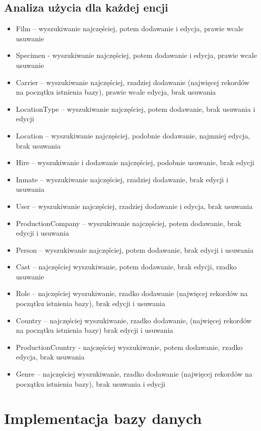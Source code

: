 \documentclass{article}
\begin{document}
\subsection{Analiza użycia dla każdej encji}
\begin{itemize}
\item Film – wyszukiwanie najczęściej, potem dodawanie i edycja, prawie wcale usuwanie
\item Specimen - wyszukiwanie najczęściej, potem dodawanie i edycja, prawie wcale usuwanie
\item Carrier – wyszukiwanie najczęściej, rzadziej dodawanie (najwięcej rekordów na początku istnienia bazy), prawie wcale edycja, brak usuwania
\item LocationType – wyszukiwanie najczęściej, potem dodawanie, brak usuwania i edycji
\item Location – wyszukiwanie najczęściej, podobnie dodawanie, najmniej edycja, brak usuwania
\item Hire – wyszukiwanie i dodawanie najczęściej, podobnie usuwanie, brak edycji
\item Inmate – wyszukiwanie najczęściej, rzadziej dodawanie, brak edycji i usuwania
\item User – wyszukiwanie najczęściej, rzadziej dodawanie i edycja, brak usuwania
\item ProductionCompany – wyszukiwanie najczęściej, potem dodawanie, brak edycji i usuwania
\item Person – wyszukiwanie najczęściej, potem dodawanie, brak edycji i usuwania
\item Cast – najczęściej wyszukiwanie, potem dodawanie, brak edycji, rzadko usuwanie
\item Role – najczęściej wyszukiwanie, rzadko dodawanie (najwięcej rekordów na początku istnienia bazy), brak edycji i usuwania
\item Country – najczęściej wyszukiwanie, rzadko dodawanie, (najwięcej rekordów na początku istnienia bazy) brak edycji i usuwania
\item ProductionCountry  - najczęściej wyszukiwanie, potem dodawanie, rzadko edycja, brak usuwania
\item Genre – najczęściej wyszukiwanie, rzadko dodawanie (najwięcej rekordów na początku istnienia bazy), brak usuwania i edycji

\end{itemize}
\section{Implementacja bazy danych}
\end{document}
